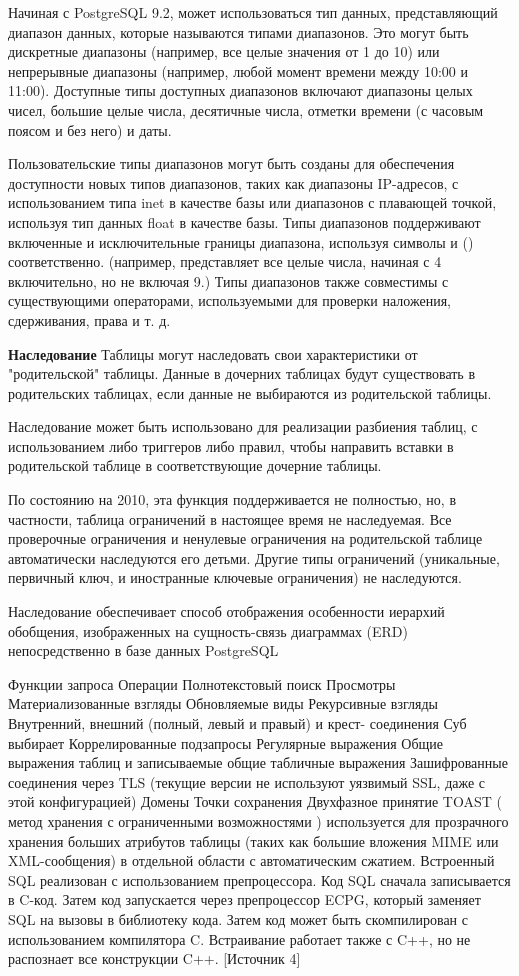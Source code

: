 Начиная с PostgreSQL 9.2, может использоваться тип данных, представляющий диапазон данных, которые называются типами диапазонов. Это могут быть дискретные диапазоны (например, все целые значения от 1 до 10) или непрерывные диапазоны (например, любой момент времени между 10:00 и 11:00). Доступные типы доступных диапазонов включают диапазоны целых чисел, большие целые числа, десятичные числа, отметки времени (с часовым поясом и без него) и даты.

Пользовательские типы диапазонов могут быть созданы для обеспечения доступности новых типов диапазонов, таких как диапазоны IP-адресов, с использованием типа inet в качестве базы или диапазонов с плавающей точкой, используя тип данных float в качестве базы. Типы диапазонов поддерживают включенные и исключительные границы диапазона, используя символы и () соответственно. (например, представляет все целые числа, начиная с 4 включительно, но не включая 9.) Типы диапазонов также совместимы с существующими операторами, используемыми для проверки наложения, сдерживания, права и т. д.

\textbf{Наследование} 
Таблицы могут наследовать свои характеристики от "родительской" таблицы. Данные в дочерних таблицах будут существовать в родительских таблицах, если данные не выбираются из родительской таблицы.

Наследование может быть использовано для реализации разбиения таблиц, с использованием либо триггеров либо правил, чтобы направить вставки в родительской таблице в соответствующие дочерние таблицы.

По состоянию на 2010, эта функция поддерживается не полностью, но, в частности, таблица ограничений в настоящее время не наследуемая. Все проверочные ограничения и ненулевые ограничения на родительской таблице автоматически наследуются его детьми. Другие типы ограничений (уникальные, первичный ключ, и иностранные ключевые ограничения) не наследуются.

Наследование обеспечивает способ отображения особенности иерархий обобщения, изображенных на сущность-связь диаграммах (ERD) непосредственно в базе данных PostgreSQL

Функции запроса
Операции
Полнотекстовый поиск
Просмотры
Материализованные взгляды
Обновляемые виды
Рекурсивные взгляды
Внутренний, внешний (полный, левый и правый) и крест- соединения
Суб выбирает
Коррелированные подзапросы
Регулярные выражения
Общие выражения таблиц и записываемые общие табличные выражения
Зашифрованные соединения через TLS (текущие версии не используют уязвимый SSL, даже с этой конфигурацией)
Домены
Точки сохранения
Двухфазное принятие
TOAST ( метод хранения с ограниченными возможностями ) используется для прозрачного хранения больших атрибутов таблицы (таких как большие вложения MIME или XML-сообщения) в отдельной области с автоматическим сжатием.
Встроенный SQL реализован с использованием препроцессора. Код SQL сначала записывается в C-код. Затем код запускается через препроцессор ECPG, который заменяет SQL на вызовы в библиотеку кода. Затем код может быть скомпилирован с использованием компилятора C. Встраивание работает также с C++, но не распознает все конструкции C++. [Источник 4]


